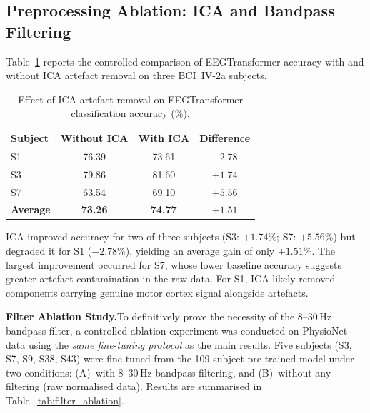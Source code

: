 \documentclass[12pt, a4paper]{article}
\begin{document}
\subsection{Preprocessing Ablation: ICA and Bandpass Filtering}
\label{sec:ica_results}

Table~\ref{tab:ica_comparison} reports the controlled comparison of EEGTransformer accuracy with and without ICA artefact removal on three BCI~IV-2a subjects.

\begin{table}[htbp]
\centering
\caption{Effect of ICA artefact removal on EEGTransformer classification accuracy (\%).}
\label{tab:ica_comparison}
\begin{tabular}{lccc}
\toprule
\textbf{Subject} & \textbf{Without ICA} & \textbf{With ICA} & \textbf{Difference} \\
\midrule
S1 & 76.39 & 73.61 & $-2.78$ \\
S3 & 79.86 & 81.60 & $+1.74$ \\
S7 & 63.54 & 69.10 & $+5.56$ \\
\midrule
\textbf{Average} & \textbf{73.26} & \textbf{74.77} & $\mathbf{+1.51}$ \\
\bottomrule
\end{tabular}
\end{table}

ICA improved accuracy for two of three subjects (S3: $+1.74\%$; S7: $+5.56\%$) but degraded it for S1 ($-2.78\%$), yielding an average gain of only $+1.51\%$. The largest improvement occurred for S7, whose lower baseline accuracy suggests greater artefact contamination in the raw data. For S1, ICA likely removed components carrying genuine motor cortex signal alongside artefacts.

\textbf{Filter Ablation Study.}\quad To definitively prove the necessity of the 8--30\,Hz bandpass filter, a controlled ablation experiment was conducted on PhysioNet data using the \emph{same fine-tuning protocol} as the main results. Five subjects (S3, S7, S9, S38, S43) were fine-tuned from the 109-subject pre-trained model under two conditions: (A)~with 8--30\,Hz bandpass filtering, and (B)~without any filtering (raw normalised data). Results are summarised in Table~\ref{tab:filter_ablation}.
\end{document}

